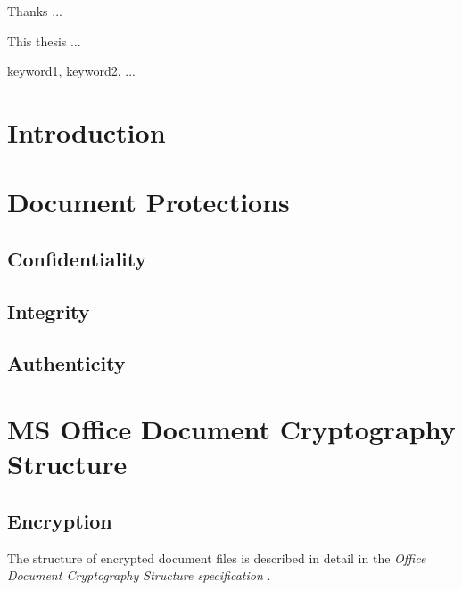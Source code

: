 \documentclass[11pt,oneside]{fithesis2}
\begin{document}
\FrontMatter
\ThesisTitlePage

\begin{ThesisDeclaration}
\DeclarationText
\AdvisorName
\end{ThesisDeclaration}

\begin{ThesisThanks}
Thanks ...
\end{ThesisThanks}

\begin{ThesisAbstract}
This thesis ...  
\end{ThesisAbstract}

\begin{ThesisKeyWords}
keyword1, keyword2, ...
\end{ThesisKeyWords}

\MainMatter

\tableofcontents 
\chapter{Introduction}

\chapter{Document Protections}

\section{Confidentiality}

\section{Integrity}

\section{Authenticity}

\chapter{MS Office Document Cryptography Structure}

\section{Encryption} 

The structure of encrypted document files is described in detail in the \textit{Office Document Cryptography Structure specification} \cite{msoffcrypto}.
\end{document}

